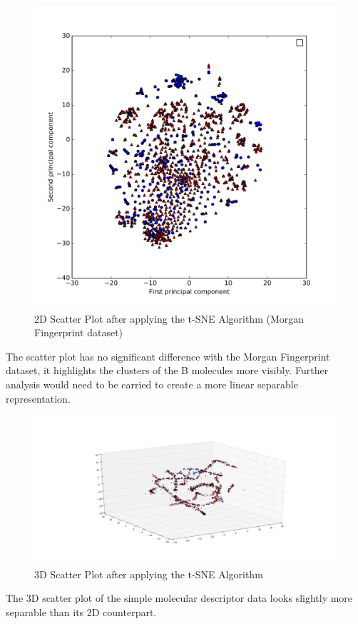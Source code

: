 \documentclass[a4paper,12pt]{report}
\begin{document}
				\begin{figure}[H]
					\centering
					\includegraphics[width=\textwidth,scale=1,totalheight=0.5\textheight]{images/scatter_tsne_mfps}
					\caption{2D Scatter Plot after applying the t-SNE Algorithm (Morgan Fingerprint dataset)}
					\label{fig:scatter_tsne_mfps_2D}
				\end{figure}
			The scatter plot has no significant difference with the Morgan Fingerprint dataset, it highlights the clusters of the B molecules more visibly. Further analysis would need to be carried to create a more linear separable representation.
				\begin{figure}[H]
					\centering
					\includegraphics[width=\textwidth,scale=1,totalheight=0.5\textheight]{images/scatter_tsne_3D}
					\caption{3D Scatter Plot after applying the t-SNE Algorithm}
					\label{fig:scatter_tsne_3D}
				\end{figure}
			The 3D scatter plot of the simple molecular descriptor data looks slightly more separable than its 2D counterpart.
\end{document}
